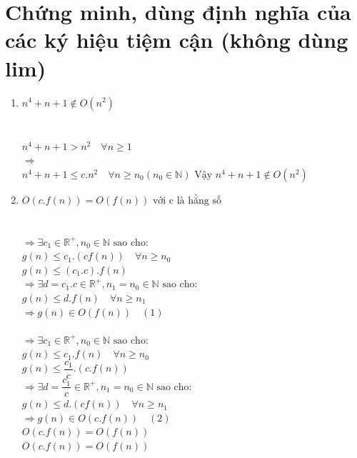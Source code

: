 \documentclass[12pt, letterpaper]{article}
\begin{document}
\section{Chứng minh, dùng định nghĩa của các ký hiệu tiệm cận (không dùng lim)}
\begin{enumerate}
    \item $n^4 + n + 1 \notin O(n^2)$ \\ \\
     \\
    $n^4 + n + 1 > n^2 \quad \forall n \geq 1$ \\ 
    $\Rightarrow$  \\
    $n^4 + n + 1 \leq c.n^2 \quad \forall n \geq n_0 (n_0 \in \mathbb{N})$
    $\text{Vậy } n^4 + n + 1 \notin O(n^2)$

    \item $O(c.f(n)) = O(f(n)) \text{ với c là hằng số}$ \\ \\
     \\
    $\Rightarrow \exists c_1 \in \mathbb{R^+}, n_0 \in \mathbb{N} \text{ sao cho:}$ \\
    $g(n) \leq c_1.(cf(n)) \quad \forall n \geq n_0$ \\
    $g(n) \leq (c_1.c).f(n)$ \\
    $\Rightarrow \exists d = c_1.c \in \mathbb{R^+},n_1 = n_0 \in \mathbb{N} \text{ sao cho:}$ \\
    $g(n) \leq d.f(n) \quad \forall n \geq n_1$ \\
    $\Rightarrow g(n) \in O(f(n)) \quad (1)$ \\

     \\
    $\Rightarrow \exists c_1 \in \mathbb{R^+}, n_0 \in \mathbb{N} \text{ sao cho:}$ \\
    $g(n) \leq c_1.f(n) \quad \forall n \geq n_0$ \\
    $g(n) \leq \dfrac{c_1}{c}.(c.f(n))$ \\
    $\Rightarrow \exists d = \dfrac{c_1}{c} \in \mathbb{R^+},n_1 = n_0 \in \mathbb{N} \text{ sao cho:}$ \\
    $g(n) \leq d.(cf(n)) \quad \forall n \geq n_1$ \\
    $\Rightarrow g(n) \in O(c.f(n)) \quad (2)$ \\

     $O(c.f(n)) = O(f(n))$\\
     $O(c.f(n)) = O(f(n))$


\end{enumerate}
\end{document}
